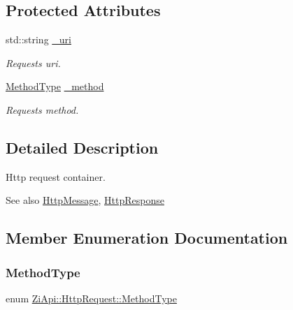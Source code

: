 \subsection*{Protected Attributes}
\begin{DoxyCompactItemize}
\item 
\mbox{\label{classZiApi_1_1HttpRequest_a30de96436841e7f49ce9d9f6a69f751e}} 
std\+::string \mbox{\hyperlink{classZiApi_1_1HttpRequest_a30de96436841e7f49ce9d9f6a69f751e}{\+\_\+uri}}
\begin{DoxyCompactList}\small\item\em Request\textquotesingle{}s uri. \end{DoxyCompactList}\item 
\mbox{\label{classZiApi_1_1HttpRequest_ad4e4fe2662f4699ad6715fc11bf454df}} 
\mbox{\hyperlink{classZiApi_1_1HttpRequest_a8592cff867cbbc5cc43bd3a4d6053a1b}{Method\+Type}} \mbox{\hyperlink{classZiApi_1_1HttpRequest_ad4e4fe2662f4699ad6715fc11bf454df}{\+\_\+method}}
\begin{DoxyCompactList}\small\item\em Request\textquotesingle{}s method. \end{DoxyCompactList}\end{DoxyCompactItemize}


\subsection{Detailed Description}
Http request container. 

\begin{DoxySeeAlso}{See also}
\mbox{\hyperlink{classZiApi_1_1HttpMessage}{Http\+Message}}, \mbox{\hyperlink{classZiApi_1_1HttpResponse}{Http\+Response}} 
\end{DoxySeeAlso}


\subsection{Member Enumeration Documentation}
\mbox{\label{classZiApi_1_1HttpRequest_a8592cff867cbbc5cc43bd3a4d6053a1b}} 
\subsubsection{\texorpdfstring{MethodType}{MethodType}}
{\footnotesize\ttfamily enum \mbox{\hyperlink{classZiApi_1_1HttpRequest_a8592cff867cbbc5cc43bd3a4d6053a1b}{Zi\+Api\+::\+Http\+Request\+::\+Method\+Type}}\hspace{0.3cm}{\ttfamily [strong]}}

